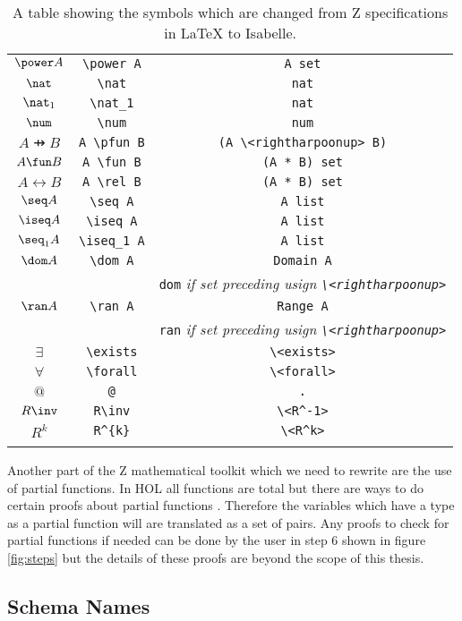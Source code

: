 {\begin{longtable}[H]{|c | c | c |}
$\power A$ & \verb|\power A| & \verb|A set| \\
$\nat$ & \verb|\nat| & \verb|nat| \\
$\nat_1$ & \verb|\nat_1| & \verb|nat| \\
$\num$ & \verb|\num| & \verb|num| \\
$A \pfun B$ & \verb|A \pfun B| & \verb|(A \<rightharpoonup> B)| \\
$A \fun B$ & \verb|A \fun B| & \verb|(A * B) set| \\
$A \rel B$ & \verb|A \rel B| & \verb|(A * B) set| \\
$\seq A$ & \verb|\seq A| & \verb|A list| \\
$\iseq A$ & \verb|\iseq A| & \verb|A list| \\
$\seq_1 A$ & \verb|\iseq_1 A| & \verb|A list| \\
$\dom A$ & \verb|\dom A| & \verb|Domain A| \\
& & \verb|dom| \textit{if set preceding usign \verb|\<rightharpoonup>|} \\
$\ran A$ & \verb|\ran A| & \verb|Range A| \\
& & \verb|ran| \textit{if set preceding usign \verb|\<rightharpoonup>|} \\
$\exists$ & \verb|\exists| & \verb|\<exists>| \\
$\forall$ & \verb|\forall| & \verb|\<forall>| \\
$@$ & \verb|@| & \verb|.| \\
$R\inv$ & \verb|R\inv| & \verb|\<R^-1>| \\
$R^{k}$ & \verb|R^{k}| & \verb|\<R^k>| \\
\hline
\caption{A table showing the symbols which are changed from Z specifications in \LaTeX{} to Isabelle.}
\label{tab:latextoisabelle}
\end{longtable}
}

Another part of the Z mathematical toolkit which we need to rewrite are the use of partial functions. In HOL all functions are total but there are ways to do certain proofs about partial functions \cite{Krauss08definingrecursive}. Therefore the variables which have a type as a partial function will are translated as a set of pairs. Any proofs to check for partial functions if needed can be done by the user in step 6 shown in figure \ref{fig:steps} but the details of these proofs are beyond the scope of this thesis.

\subsection{Schema Names}

